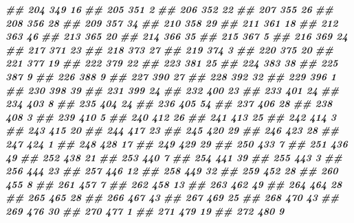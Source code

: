 \documentclass[
]{book}
\newenvironment{Shaded}{\begin{snugshade}}{\end{snugshade}}
\newcommand{\DocumentationTok}[1]{\textcolor[rgb]{0.56,0.35,0.01}{\textbf{\textit{#1}}}}
\theoremstyle{definition}
\theoremstyle{definition}
\theoremstyle{definition}
\theoremstyle{definition}
\theoremstyle{remark}
\begin{document}
\begin{Shaded}
\begin{Highlighting}[]
\DocumentationTok{\#\# 204    349 16}
\DocumentationTok{\#\# 205    351  2}
\DocumentationTok{\#\# 206    352 22}
\DocumentationTok{\#\# 207    355 26}
\DocumentationTok{\#\# 208    356 28}
\DocumentationTok{\#\# 209    357 34}
\DocumentationTok{\#\# 210    358 29}
\DocumentationTok{\#\# 211    361 18}
\DocumentationTok{\#\# 212    363 46}
\DocumentationTok{\#\# 213    365 20}
\DocumentationTok{\#\# 214    366 35}
\DocumentationTok{\#\# 215    367  5}
\DocumentationTok{\#\# 216    369 24}
\DocumentationTok{\#\# 217    371 23}
\DocumentationTok{\#\# 218    373 27}
\DocumentationTok{\#\# 219    374  3}
\DocumentationTok{\#\# 220    375 20}
\DocumentationTok{\#\# 221    377 19}
\DocumentationTok{\#\# 222    379 22}
\DocumentationTok{\#\# 223    381 25}
\DocumentationTok{\#\# 224    383 38}
\DocumentationTok{\#\# 225    387  9}
\DocumentationTok{\#\# 226    388  9}
\DocumentationTok{\#\# 227    390 27}
\DocumentationTok{\#\# 228    392 32}
\DocumentationTok{\#\# 229    396  1}
\DocumentationTok{\#\# 230    398 39}
\DocumentationTok{\#\# 231    399 24}
\DocumentationTok{\#\# 232    400 23}
\DocumentationTok{\#\# 233    401 24}
\DocumentationTok{\#\# 234    403  8}
\DocumentationTok{\#\# 235    404 24}
\DocumentationTok{\#\# 236    405 54}
\DocumentationTok{\#\# 237    406 28}
\DocumentationTok{\#\# 238    408  3}
\DocumentationTok{\#\# 239    410  5}
\DocumentationTok{\#\# 240    412 26}
\DocumentationTok{\#\# 241    413 25}
\DocumentationTok{\#\# 242    414  3}
\DocumentationTok{\#\# 243    415 20}
\DocumentationTok{\#\# 244    417 23}
\DocumentationTok{\#\# 245    420 29}
\DocumentationTok{\#\# 246    423 28}
\DocumentationTok{\#\# 247    424  1}
\DocumentationTok{\#\# 248    428 17}
\DocumentationTok{\#\# 249    429 29}
\DocumentationTok{\#\# 250    433  7}
\DocumentationTok{\#\# 251    436 49}
\DocumentationTok{\#\# 252    438 21}
\DocumentationTok{\#\# 253    440  7}
\DocumentationTok{\#\# 254    441 39}
\DocumentationTok{\#\# 255    443  3}
\DocumentationTok{\#\# 256    444 23}
\DocumentationTok{\#\# 257    446 12}
\DocumentationTok{\#\# 258    449 32}
\DocumentationTok{\#\# 259    452 28}
\DocumentationTok{\#\# 260    455  8}
\DocumentationTok{\#\# 261    457  7}
\DocumentationTok{\#\# 262    458 13}
\DocumentationTok{\#\# 263    462 49}
\DocumentationTok{\#\# 264    464 28}
\DocumentationTok{\#\# 265    465 28}
\DocumentationTok{\#\# 266    467 43}
\DocumentationTok{\#\# 267    469 25}
\DocumentationTok{\#\# 268    470 43}
\DocumentationTok{\#\# 269    476 30}
\DocumentationTok{\#\# 270    477  1}
\DocumentationTok{\#\# 271    479 19}
\DocumentationTok{\#\# 272    480  9}

\end{Highlighting}
\end{Shaded}
\end{document}
